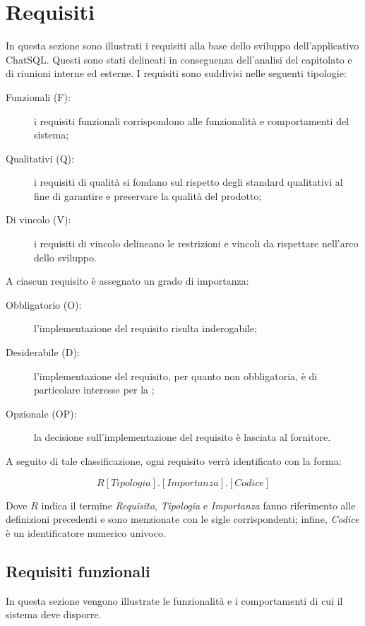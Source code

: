 \section{Requisiti}
\par In questa sezione sono illustrati i requisiti alla base dello sviluppo dell'applicativo ChatSQL. Questi sono stati delineati in conseguenza dell'analisi del capitolato e di riunioni interne ed esterne. I requisiti sono suddivisi nelle seguenti tipologie:
\begin{description}
  \item[Funzionali (F):] i requisiti funzionali corrispondono alle funzionalità  e comportamenti del sistema;
  \item[Qualitativi (Q):] i requisiti di qualità si fondano sul rispetto degli standard qualitativi al fine di garantire e preservare la qualità del prodotto;
  \item[Di vincolo (V):] i requisiti di vincolo delineano le restrizioni e vincoli da rispettare nell'arco dello sviluppo.
\end{description}
\par A ciascun requisito è assegnato un grado di importanza:
\begin{description}
  \item[Obbligatorio (O):] l'implementazione del requisito risulta inderogabile;
  \item[Desiderabile (D):] l'implementazione del requisito, per quanto non obbligatoria, è di particolare interesse per la ;
  \item[Opzionale (OP):] la decisione sull'implementazione del requisito è lasciata al fornitore.
\end{description}
\par A seguito di tale classificazione, ogni requisito verrà identificato con la forma:
\par \textbf{\[R[Tipologia].[Importanza].[Codice]\]}
\par Dove \textbf{\(R\)} indica il termine \emph{Requisito}, \emph{Tipologia} e \emph{Importanza} fanno riferimento alle definizioni precedenti e sono menzionate con le sigle corrispondenti; infine, \emph{Codice} è un identificatore numerico univoco.

\subsection{Requisiti funzionali}
\par In questa sezione vengono illustrate le funzionalità e i comportamenti di cui il sistema deve disporre.

